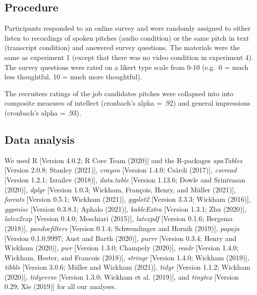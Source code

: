 \documentclass[
  english,
  man]{apa6}
\begin{document}
\hypertarget{procedure}{%
\subsection{Procedure}\label{procedure}}

Participants responded to an online survey and were randomly assigned to either listen to recordings of spoken pitches (audio condition) or the same pitch in text (transcript condition) and answered survey questions. The materials were the same as experiment 1 (except that there was no video condition in experiment 4). The survey questions were rated on a likert type scale from 0-10 (e.g.~0 = much less thoughtful, 10 = much more thoughtful).

The recruiters ratings of the job candidates pitches were collapsed into into composite measures of intellect (cronbach's alpha = .92) and general impressions (cronbach's alpha = .93).

\hypertarget{data-analysis}{%
\subsection{Data analysis}\label{data-analysis}}

We used R {[}Version 4.0.2; R Core Team (2020){]} and the R-packages \emph{apaTables} {[}Version 2.0.8; Stanley (2021){]}, \emph{crayon} {[}Version 1.4.0; Csárdi (2017){]}, \emph{csvread} {[}Version 1.2.1; Izrailev (2018){]}, \emph{data.table} {[}Version 1.13.6; Dowle and Srinivasan (2020){]}, \emph{dplyr} {[}Version 1.0.3; Wickham, François, Henry, and Müller (2021){]}, \emph{forcats} {[}Version 0.5.1; Wickham (2021){]}, \emph{ggplot2} {[}Version 3.3.3; Wickham (2016){]}, \emph{ggpmisc} {[}Version 0.3.8.1; Aphalo (2021){]}, \emph{kableExtra} {[}Version 1.3.1; Zhu (2020){]}, \emph{latex2exp} {[}Version 0.4.0; Meschiari (2015){]}, \emph{latexpdf} {[}Version 0.1.6; Bergsma (2018){]}, \emph{pandocfilters} {[}Version 0.1.4; Schwendinger and Hornik (2019){]}, \emph{papaja} {[}Version 0.1.0.9997; Aust and Barth (2020){]}, \emph{purrr} {[}Version 0.3.4; Henry and Wickham (2020){]}, \emph{pwr} {[}Version 1.3.0; Champely (2020){]}, \emph{readr} {[}Version 1.4.0; Wickham, Hester, and Francois (2018){]}, \emph{stringr} {[}Version 1.4.0; Wickham (2019){]}, \emph{tibble} {[}Version 3.0.6; Müller and Wickham (2021){]}, \emph{tidyr} {[}Version 1.1.2; Wickham (2020){]}, \emph{tidyverse} {[}Version 1.3.0; Wickham et al. (2019){]}, and \emph{tinytex} {[}Version 0.29; Xie (2019){]} for all our analyses.
\end{document}
